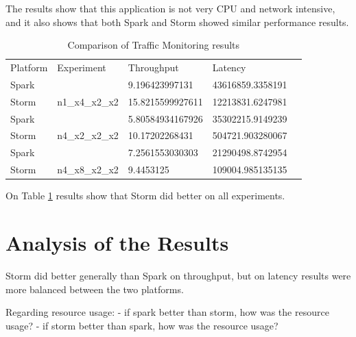 \documentclass[ppgc,diss,english]{iiufrgs}
\begin{document}
The results show that this application is not very CPU and network intensive, and it also shows that both Spark and Storm showed similar performance results.

\begin{table}[H]
\tiny
\centering
\caption{Comparison of Traffic Monitoring results}
\label{table:traffic-monitoring-results}
\begin{tabular}{|l|l|l|l|l}
\cline{1-4}
Platform & Experiment                       & Throughput                               & Latency                                  &  \\ \cline{1-4}
Spark    &                                  & 9.196423997131                           & 43616859.3358191                         &  \\ \cline{1-1} \cline{3-4}
Storm    & \multirow{-2}{*}{n1\_x4\_x2\_x2} & \cellcolor[HTML]{67FD9A}15.8215599927611 & \cellcolor[HTML]{67FD9A}12213831.6247981 &  \\ \cline{1-4}
Spark    &                                  & 5.80584934167926                         & 35302215.9149239                         &  \\ \cline{1-1} \cline{3-4}
Storm    & \multirow{-2}{*}{n4\_x2\_x2\_x2} & \cellcolor[HTML]{67FD9A}10.17202268431   & \cellcolor[HTML]{67FD9A}504721.903280067 &  \\ \cline{1-4}
Spark    &                                  & 7.2561553030303                          & 21290498.8742954                         &  \\ \cline{1-1} \cline{3-4}
Storm    & \multirow{-2}{*}{n4\_x8\_x2\_x2} & \cellcolor[HTML]{67FD9A}9.4453125        & \cellcolor[HTML]{67FD9A}109004.985135135 &  \\ \cline{1-4}
\end{tabular}
\end{table}

On Table \ref{table:traffic-monitoring-results} results show that Storm did better on all experiments.


\section{Analysis of the Results}

Storm did better generally than Spark on throughput, but on latency results were more balanced between the two platforms.

Regarding resource usage:
- if spark better than storm, how was the resource usage?
- if storm better than spark, how was the resource usage?
\end{document}
